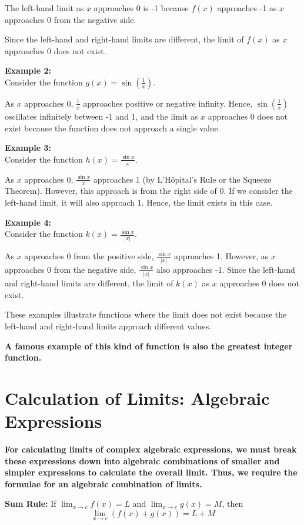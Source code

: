 The left-hand limit as $x$ approaches 0 is -1 because $f(x)$ approaches -1 as $x$ approaches 0 from the negative side.

Since the left-hand and right-hand limits are different, the limit of $f(x)$ as $x$ approaches 0 does not exist.

\textbf{Example 2:} \\
Consider the function $g(x) = \sin\left(\frac{1}{x}\right)$.

As $x$ approaches 0, $\frac{1}{x}$ approaches positive or negative infinity. Hence, $\sin\left(\frac{1}{x}\right)$ oscillates infinitely between -1 and 1, and the limit as $x$ approaches 0 does not exist because the function does not approach a single value.

\textbf{Example 3:} \\
Consider the function $h(x) = \frac{\sin x}{x}$.

As $x$ approaches 0, $\frac{\sin x}{x}$ approaches 1 (by L'Hôpital's Rule or the Squeeze Theorem). However, this approach is from the right side of 0. If we consider the left-hand limit, it will also approach 1. Hence, the limit exists in this case.

\textbf{Example 4:} \\
Consider the function $k(x) = \frac{\sin x}{|x|}$.

As $x$ approaches 0 from the positive side, $\frac{\sin x}{|x|}$ approaches 1. However, as $x$ approaches 0 from the negative side, $\frac{\sin x}{|x|}$ also approaches -1. Since the left-hand and right-hand limits are different, the limit of $k(x)$ as $x$ approaches 0 does not exist.

These examples illustrate functions where the limit does not exist because the left-hand and right-hand limits approach different values.


\textbf{A famous example of this kind of function is also the greatest integer function.}


\section{Calculation of Limits: Algebraic Expressions}

\textbf{For calculating limits of complex algebraic expressions, we must break these expressions down into algebraic combinations of smaller and simpler expressions to calculate the overall limit. Thus, we require the formulae for an algebraic combination of limits.}

\textbf{Sum Rule:} If $\lim_{x \to c} f(x) = L$ and $\lim_{x \to c} g(x) = M$, then
\[ \lim_{x \to c} (f(x) + g(x)) = L + M \]

